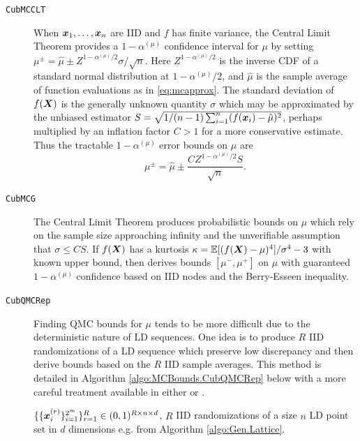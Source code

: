 \documentclass{article}[12pt]
\begin{document}
\begin{description}
    \item[\texttt{CubMCCLT}] When $\boldsymbol{x}_1,\dots,\boldsymbol{x}_n$ are IID and $f$ has finite variance, the Central Limit Theorem provides a $1-\alpha^{(\mu)}$ confidence interval for $\mu$ by setting $\mu^\pm = \hat{\mu} \pm Z^{1-\alpha^{(\mu)}/2}\sigma/\sqrt{n}$. Here $Z^{1-\alpha^{(\mu)}/2}$ is the inverse CDF of a standard normal distribution at $1-\alpha^{(\mu)}/2$, and $\hat{\mu}$ is the sample average of function evaluations as in \eqref{eq:mcapprox}. The standard deviation of $f(\boldsymbol{X})$ is the generally unknown quantity $\sigma$ which may be approximated by the unbiased estimator $S = \sqrt{1/(n-1)\sum_{i=1}^n(f(\boldsymbol{x}_i)-\hat{\mu})^2}$, perhaps multiplied by an inflation factor $C>1$ for a more conservative estimate. Thus the tractable $1-\alpha^{(\mu)}$ error bounds on $\mu$ are
    \begin{equation*}
        \mu^\pm = \hat{\mu} \pm \frac{CZ^{1-\alpha^{(\mu)}/2}S}{\sqrt{n}}
        \label{eq:clt_mu_bounds}.
    \end{equation*}
    \item[\texttt{CubMCG}] The Central Limit Theorem produces probabilistic bounds on $\mu$ which rely on the sample size approaching infinity and the unverifiable assumption that $\sigma \leq CS$. If $f(\boldsymbol{X})$ has a kurtosis $\kappa = \mathbb{E}[(f(\boldsymbol{X})-\mu)^4]/\sigma^4-3$ with known upper bound, then   \cite{cubmcg} derives bounds $[\mu^-,\mu^+]$ on $\mu$ with guaranteed $1-\alpha^{(\mu)}$ confidence based on IID nodes and the Berry-Esseen inequality.
    \item[\texttt{CubQMCRep}] Finding QMC bounds for $\mu$ tends to be more difficult due to the deterministic nature of LD sequences. One idea is to produce $R$ IID randomizations of a LD sequence which preserve low discrepancy and then derive bounds based on the $R$ IID sample averages. This method is detailed in Algorithm \ref{algo:MCBounds.CubQMCRep} below with a more careful treatment available in either \cite[Chapter 17]{mcbook} or \cite{qmc4pde_preprint}. \begin{algorithm}[h!]
        \caption{$\texttt{MCBounds.CubQMCRep}\left(\{\{\bx_i^{(r)}\}_{i=1}^n\}_{r=1}^R, \{\{y_i^{(r)}\}_{i=1}^n\}_{r=1}^R, \alpha^{(\mu)}\right)$}
        \label{algo:MCBounds.CubQMCRep}
        \begin{algorithmic}
        \Require $\{\{\boldsymbol{x}_i^{(r)}\}_{i=1}^{2^m}\}_{r=1}^R \in (0,1)^{R \times n \times d}$, $R$ IID randomizations of a size $n$ LD point set in $d$ dimensions e.g. from Algorithm \ref{algo:Gen.Lattice}.

\end{algorithmic}
\end{algorithm}
\end{description}
\end{document}

